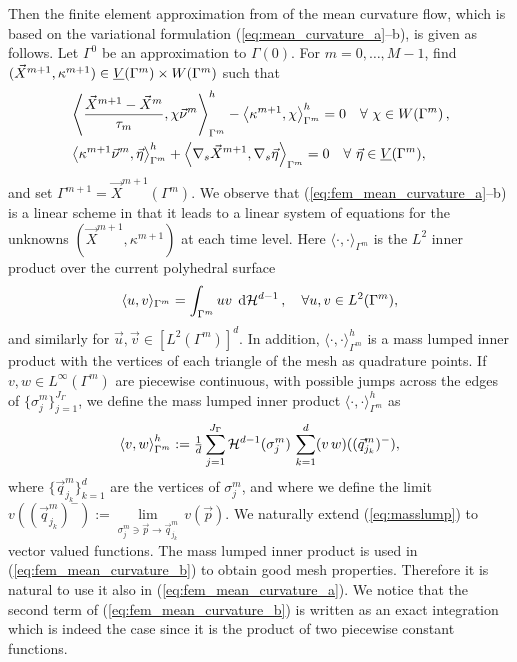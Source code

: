 Then the finite element approximation from \cite{triplejMC,gflows3d} of the
mean curvature flow, which is based on the variational formulation
(\ref{eq:mean_curvature_a}--b), is given as follows. Let $\Gamma^0$ be an
approximation to $\Gamma(0)$. For $m=0,\ldots,M-1$, find $(\vec X^{m+1},
\kappa^{m+1}) \in \underline{V}(\Gamma^m) \times W(\Gamma^m)$ such that
\begin{subequations}
\begin{align}
&\left\langle \frac{\vec X^{m + 1} - \vec X^m}{\tau_m},
\chi\vec \nu^m\right\rangle_{\Gamma^m}^h - \left\langle\kappa^{m+1}, \chi
\right\rangle_{\Gamma^m}^h=0\quad \forall\ \chi \in
W(\Gamma^m)\,,\label{eq:fem_mean_curvature_a}\\
&\left\langle\kappa^{m+1}\vec \nu^m, \vec \eta\right\rangle_{\Gamma^m}^h +
\left\langle\nabla_s\vec X^{m + 1},
\nabla_s\vec \eta\right\rangle_{\Gamma^m}=0\quad \forall\ \vec\eta \in \underline{V}(\Gamma^m),
\label{eq:fem_mean_curvature_b}
\end{align}
\end{subequations}
and set $\Gamma^{m+1} = \vec X^{m+1}(\Gamma^m)$. We observe that
(\ref{eq:fem_mean_curvature_a}--b) is a linear scheme in that it leads to a
linear system of equations for the unknowns $(\vec X^{m+1}, \kappa^{m+1})$ at
each time level. Here $\langle\cdot,\cdot\rangle_{\Gamma^m}$ is the $L^2$ inner
product over the current polyhedral surface
\begin{equation}
\langle u,v\rangle_{\Gamma^m} =
\int_{\Gamma^m}uv\,\;{\rm d}{\cal H}^{d-1}\,, \quad\forall u,v \in
L^2(\Gamma^m),
\end{equation}
and similarly for $\vec u,\vec v\in [L^2(\Gamma^m)]^d$. In addition,
$\langle \cdot,\cdot\rangle_{\Gamma^m}^h$ is a mass lumped inner product with
the vertices of each triangle of the mesh as quadrature points. If $v,w \in
L^\infty(\Gamma^m)$ are piecewise continuous, with possible jumps
across the edges of $\{\sigma_j^m\}_{j=1}^{J_\Gamma}$, we define the mass
lumped inner product $\langle\cdot,\cdot\rangle_{\Gamma^m}^h$ as
\begin{equation} \label{eq:masslump}
\left\langle v, w \right\rangle^h_{\Gamma^m} :=
\tfrac1d \sum_{j=1}^{J_\Gamma} \mathcal{H}^{d-1}(\sigma^m_j)\,
\sum_{k=1}^d (v\,w)((\vec q^m_{j_k})^-),
\end{equation}
where $\{\vec q^m_{j_k}\}_{k=1}^d$ are the vertices of $\sigma^m_j$, and
where we define the limit $v((\vec q^m_{j_k})^-)
:= \underset{\sigma^m_j\ni \vec p\to \vec q^m_{j_k}}{\lim}\, v(\vec p)$. We
naturally extend (\ref{eq:masslump}) to vector valued functions. The mass
lumped inner product is used in (\ref{eq:fem_mean_curvature_b}) to obtain good
mesh properties. Therefore it is natural to use it also in
(\ref{eq:fem_mean_curvature_a}). We notice that the second term of
(\ref{eq:fem_mean_curvature_b}) is written as an exact integration which is
indeed the case since it is the product of two piecewise constant functions.


